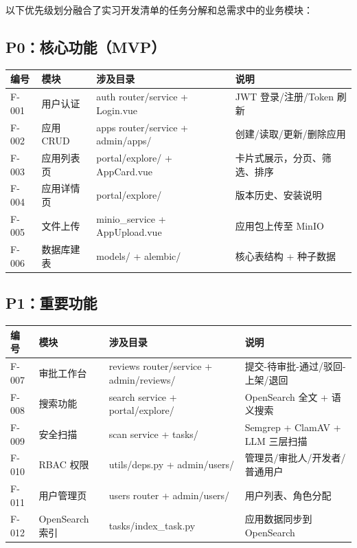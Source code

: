 \documentclass[11pt,a4paper]{article}
\begin{document}
以下优先级划分融合了实习开发清单的任务分解和总需求中的业务模块：

\subsection{P0：核心功能（MVP）}

\begin{table}[h]
\centering
\begin{tabularx}{\linewidth}{lllX}
\toprule
\textbf{编号} & \textbf{模块} & \textbf{涉及目录} & \textbf{说明} \\
\midrule
F-001 & 用户认证 & auth router/service + Login.vue & JWT 登录/注册/Token 刷新 \\
F-002 & 应用 CRUD & apps router/service + admin/apps/ & 创建/读取/更新/删除应用 \\
F-003 & 应用列表页 & portal/explore/ + AppCard.vue & 卡片式展示，分页、筛选、排序 \\
F-004 & 应用详情页 & portal/explore/ & 版本历史、安装说明 \\
F-005 & 文件上传 & minio\_service + AppUpload.vue & 应用包上传至 MinIO \\
F-006 & 数据库建表 & models/ + alembic/ & 核心表结构 + 种子数据 \\
\bottomrule
\end{tabularx}
\end{table}

\subsection{P1：重要功能}

\begin{table}[h]
\centering
\begin{tabularx}{\linewidth}{lllX}
\toprule
\textbf{编号} & \textbf{模块} & \textbf{涉及目录} & \textbf{说明} \\
\midrule
F-007 & 审批工作台 & reviews router/service + admin/reviews/ & 提交-待审批-通过/驳回-上架/退回 \\
F-008 & 搜索功能 & search service + portal/explore/ & OpenSearch 全文 + 语义搜索 \\
F-009 & 安全扫描 & scan service + tasks/ & Semgrep + ClamAV + LLM 三层扫描 \\
F-010 & RBAC 权限 & utils/deps.py + admin/users/ & 管理员/审批人/开发者/普通用户 \\
F-011 & 用户管理页 & users router + admin/users/ & 用户列表、角色分配 \\
F-012 & OpenSearch 索引 & tasks/index\_task.py & 应用数据同步到 OpenSearch \\
\bottomrule
\end{tabularx}
\end{table}
\end{document}
